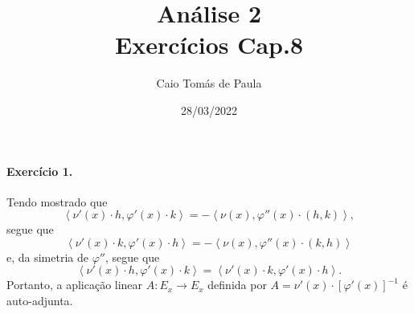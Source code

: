 \documentclass[12pt,a4paper]{article}
\title{\textbf{Análise 2}\\ Exercícios Cap.8}
\author{Caio Tomás de Paula}
\date{28/03/2022}
\begin{document}
\maketitle

\paragraph{Exercício 1.}
%


Tendo mostrado que
%
\begin{equation*}
    \left\langle
    \nu'(x) \cdot h, \varphi'(x) \cdot k
    \right\rangle
    =
    - \left\langle
    \nu(x), \varphi''(x) \cdot (h, k)
    \right\rangle,
\end{equation*}
%
segue que
%
\begin{equation*}
    \left\langle
    \nu'(x) \cdot k, \varphi'(x) \cdot h
    \right\rangle
    =
    - \left\langle
    \nu(x), \varphi''(x) \cdot (k, h)
    \right\rangle
\end{equation*}
%
e, da simetria de $\varphi''$, segue que
%
\begin{equation*}
    \left\langle
    \nu'(x) \cdot h, \varphi'(x) \cdot k
    \right\rangle
    =
    \left\langle
    \nu'(x) \cdot k, \varphi'(x) \cdot h
    \right\rangle.
\end{equation*}
%
Portanto, a aplicação linear $A: E_x \to E_x$ definida por $A = \nu'(x) \cdot [\varphi'(x)]^{-1}$
é auto-adjunta.
%
\end{document}
